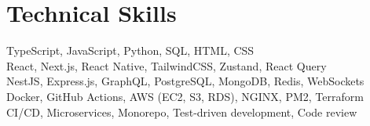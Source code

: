 \section{Technical Skills}
\begin{itemize}[leftmargin=0.15in, label={}]
\small{
    \item{
        TypeScript, JavaScript, Python, SQL, HTML, CSS \\
        React, Next.js, React Native, TailwindCSS, Zustand, React Query \\
        NestJS, Express.js, GraphQL, PostgreSQL, MongoDB, Redis, WebSockets \\
        Docker, GitHub Actions, AWS (EC2, S3, RDS), NGINX, PM2, Terraform \\
        CI/CD, Microservices, Monorepo, Test-driven development, Code review
    }
}
\end{itemize}
